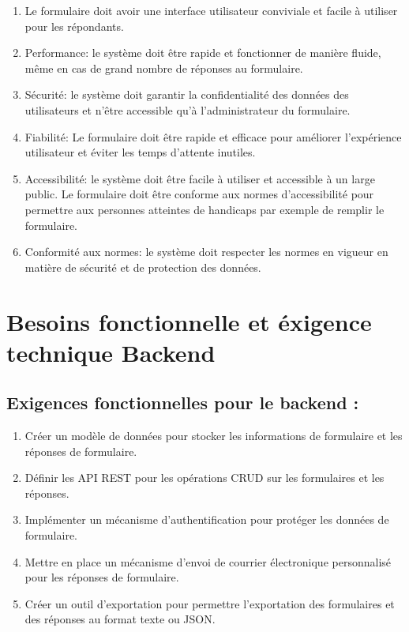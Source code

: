 \documentclass{article}
\begin{document}
\begin{enumerate}
\item Le formulaire doit avoir une interface utilisateur conviviale et facile à utiliser pour les répondants.

\item Performance: le système doit être rapide et fonctionner de manière fluide, même en cas de grand nombre de réponses au formulaire.
\item Sécurité: le système doit garantir la confidentialité des données des utilisateurs et n'être accessible qu'à l'administrateur du formulaire.
\item Fiabilité: Le formulaire doit être rapide et efficace pour améliorer l'expérience utilisateur et éviter les temps d'attente inutiles.

\item Accessibilité: le système doit être facile à utiliser et accessible à un large public.
Le formulaire doit être conforme aux normes d'accessibilité pour permettre aux personnes atteintes de handicaps par exemple de remplir le formulaire.

\item Conformité aux normes: le système doit respecter les normes en vigueur en matière de sécurité et de protection des données.
\end{enumerate}
\newpage
\section{Besoins fonctionnelle et éxigence technique Backend}

\subsection {Exigences fonctionnelles pour le backend :}
\begin{enumerate}
\item Créer un modèle de données pour stocker les informations de formulaire et les réponses de formulaire.
\item Définir les API REST pour les opérations CRUD sur les formulaires et les réponses.
\item Implémenter un mécanisme d'authentification pour protéger les données de formulaire.
\item Mettre en place un mécanisme d'envoi de courrier électronique personnalisé pour les réponses de formulaire.
\item Créer un outil d'exportation pour permettre l'exportation des formulaires et des réponses au format texte ou JSON.
\end{enumerate}
\end{document}
